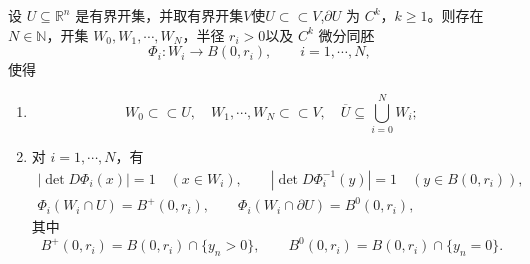 \documentclass[../../main.tex]{subfiles}
\begin{document}
\begin{lemma}[边界拉直覆盖]\label{lemma:ch05-边界拉直覆盖}
设 $U\subseteq\mathbb{R}^{n}$ 是有界开集，并取有界开集$V$使$U\subset\subset V$,$\partial U$ 为 $C^{k}$，$k\geqslant1$。则存在 $N\in\mathbb{N}$，开集 $W_0,W_1,\cdots,W_N$，半径 $r_i>0$以及 $C^{k}$ 微分同胚
\[
\Phi_i:W_i\longrightarrow B(0,r_i),
\qquad i=1,\cdots,N,
\]
使得
\begin{enumerate}[(1)]
\item \[
W_0\subset\subset U,\quad W_1,\cdots,W_N\subset\subset V,\quad \overline{U}\subseteq\bigcup_{i=0}^{N}W_i;
\]

\item 对 $i=1,\cdots,N$，有
\begin{gather*}
\left| \det D\Phi _i(x) \right|=1\quad (x\in W_i),\qquad | \det D\Phi _{i}^{-1}(y) |=1\quad (y\in B(0,r_i)),
\\
\Phi _i(W_i\cap U)=B^+(0,r_i),\qquad \Phi _i(W_i\cap \partial U)=B^0(0,r_i),
\end{gather*}
其中
\[
B^{+}(0,r_i)=B(0,r_i)\cap\{y_n>0\},
\qquad
B^{0}(0,r_i)=B(0,r_i)\cap\{y_n=0\}.
\]
\end{enumerate}
\end{lemma}
\end{document}
